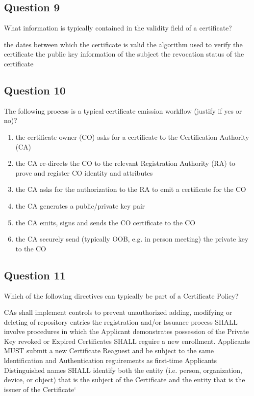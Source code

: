 \subsection*{Question 9}
What information is typically contained in the validity field of a certificate?
\begin{itemize}
  \correct the dates between which the certificate is valid 
  \incorrect the algorithm used to verify the certificate
  \incorrect the public key information of the subject
  \incorrect the revocation status of the certificate
\end{itemize}
\subsection*{Question 10}
The following process is a typical certificate emission workflow (justify if yes or no)?
\begin{enumerate}
  \item the certificate owner (CO) asks for a certificate to the
  Certification Authority (CA)
  \item the CA re-directs the CO to the relevant Registration Authority
  (RA) to prove and register CO identity and attributes
  \item the CA asks for the authorization to the RA to emit a certificate
  for the CO
  \item the CA generates a public/private key pair 
  \item the CA emits, signs and sends the CO certificate to the CO
  \item the CA securely send (typically OOB, e.g. in person meeting) the
  private key to the CO
\end{enumerate}
\subsection*{Question 11}
Which of the following directives can typically be part of a Certificate
Policy?
\begin{itemize}
  \correct CAs shall implement controls to prevent unauthorized adding, modifying
    or deleting of repository entries
  \correct the registration and/or Issuance process SHALL involve procedures in
    which the Applicant demonstrates possession of the Private Key
  \correct revoked or Expired Certificates SHALL reguire a new enrollment.
    Applicants MUST submit a new Certificate Reaguest and be subject to the
    same ldentification and Authentication reguirements as first-time
    Applicants
  \incorrect Distinguished names SHALL identify both the entity (i.e. person,
    organization, device, or object) that is the subject of the Certificate and
    the entity that is the issuer of the Certificate`
\end{itemize}
